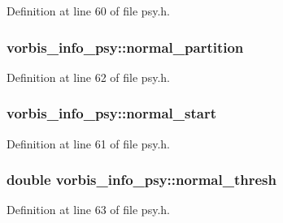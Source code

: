 Definition at line 60 of file psy.\+h.

\subsubsection[{\texorpdfstring{normal\+\_\+partition}{normal_partition}}]{ vorbis\+\_\+info\+\_\+psy\+::normal\+\_\+partition}\hypertarget{structvorbis__info__psy_a96b80a288323a1ce2fc2e9f65d48c5b1}{}\label{structvorbis__info__psy_a96b80a288323a1ce2fc2e9f65d48c5b1}


Definition at line 62 of file psy.\+h.

\subsubsection[{\texorpdfstring{normal\+\_\+start}{normal_start}}]{ vorbis\+\_\+info\+\_\+psy\+::normal\+\_\+start}\hypertarget{structvorbis__info__psy_a04680a3cb4a277fa8534e23d62e8939b}{}\label{structvorbis__info__psy_a04680a3cb4a277fa8534e23d62e8939b}


Definition at line 61 of file psy.\+h.

\subsubsection[{\texorpdfstring{normal\+\_\+thresh}{normal_thresh}}]{\setlength{\rightskip}{0pt plus 5cm}double vorbis\+\_\+info\+\_\+psy\+::normal\+\_\+thresh}\hypertarget{structvorbis__info__psy_ac733f35b4ca08d41b3de512e903e3ae0}{}\label{structvorbis__info__psy_ac733f35b4ca08d41b3de512e903e3ae0}


Definition at line 63 of file psy.\+h.

